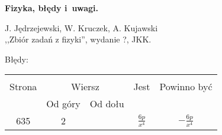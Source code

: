 \documentclass[a4paper,11pt]{article}
\newcommand{\fr}{\frac}
\newcommand{\tb}{\textbf}
\newcommand{\Field}[1]{ \begin{center} {\Large \tb{#1} } \end{center} }
\begin{document}
\Field{ Fizyka, błędy i~uwagi.} \vspace{1em}



\begin{center}
  J. Jędrzejewski, W. Kruczek, A. Kujawski \\
  ,,Zbiór zadań z fizyki'', wydanie ?, JKK.
\end{center}




Błędy:\\
\begin{center}
  \begin{tabular}{|c|c|c|c|c|}
    \hline
    & \multicolumn{2}{c|}{} & & \\
    Strona & \multicolumn{2}{c|}{Wiersz} & Jest
                              & Powinno być \\ \cline{2-3}
    & Od góry & Od dołu & & \\
    \hline
    635 &  2 & & $\fr{ 6 p }{ x^{ 4 } }$ & $-\fr{ 6 p }{ x^{ 4 } }$ \\
    \hline
  \end{tabular}
\end{center}



 {}
\end{document}
